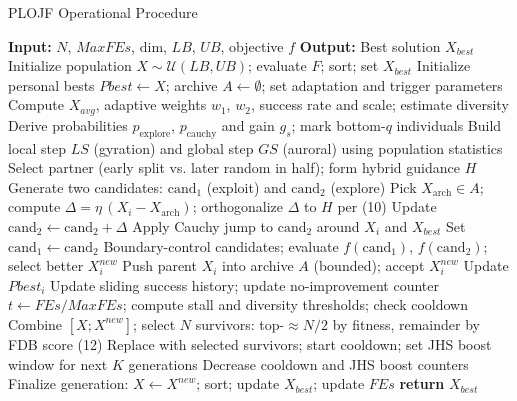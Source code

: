 \documentclass[3p]{elsarticle}
\begin{document}
\begin{algorithm}
\caption{PLOJF Operational Procedure}
\label{alg:plojf}
\begin{algorithmic}[1]
\State \textbf{Input:} $N$, $MaxFEs$, $\mathrm{dim}$, $LB$, $UB$, objective $f$
\State \textbf{Output:} Best solution $X_{best}$
\State Initialize population $X\sim\mathcal{U}(LB,UB)$; evaluate $F$; sort; set $X_{best}$
\State Initialize personal bests $Pbest\leftarrow X$; archive $A\leftarrow\emptyset$; set adaptation and trigger parameters
    \State Compute $X_{avg}$, adaptive weights $w_1$, $w_2$, success rate and scale; estimate diversity
    \State Derive probabilities $p_{\mathrm{explore}}$, $p_{\mathrm{cauchy}}$ and gain $g_s$; mark bottom-$q$ individuals
        \State Build local step $LS$ (gyration) and global step $GS$ (auroral) using population statistics
        \State Select partner (early split vs. later random in half); form hybrid guidance $H$
        \State Generate two candidates: $\mathrm{cand}_1$ (exploit) and $\mathrm{cand}_2$ (explore)
            \State Pick $X_{\!\text{arch}}\in A$; compute $\Delta=\eta\,(X_i-X_{\!\text{arch}})$; orthogonalize $\Delta$ to $H$ per (10)
            \State Update $\mathrm{cand}_2 \leftarrow \mathrm{cand}_2 + \Delta$ \hfill
        \EndIf
         \State Apply Cauchy jump to $\mathrm{cand}_2$ around $X_i$ and $X_{best}$ \EndIf
         \State Set $\mathrm{cand}_1 \leftarrow \mathrm{cand}_2$ \EndIf
        \State Boundary-control candidates; evaluate $f(\mathrm{cand}_1)$, $f(\mathrm{cand}_2)$; select better $X^{new}_i$
         \State Push parent $X_i$ into archive $A$ (bounded); accept $X^{new}_i$ \EndIf
         \State Update $Pbest_i$ \EndIf
    \EndFor
    \State Update sliding success history; update no-improvement counter
    \State $t \leftarrow FEs/MaxFEs$; compute stall and diversity thresholds; check cooldown
        \State Combine $[X; X^{new}]$; select $N$ survivors: top-$\approx N/2$ by fitness, remainder by FDB score (12)
        \State Replace with selected survivors; start cooldown; set JHS boost window for next $K$ generations
    \EndIf
    \State Decrease cooldown and JHS boost counters
    \State Finalize generation: $X\leftarrow X^{new}$; sort; update $X_{best}$; update $FEs$
\EndWhile
\State \textbf{return} $X_{best}$
\end{algorithmic}
\end{algorithm}
\end{document}
